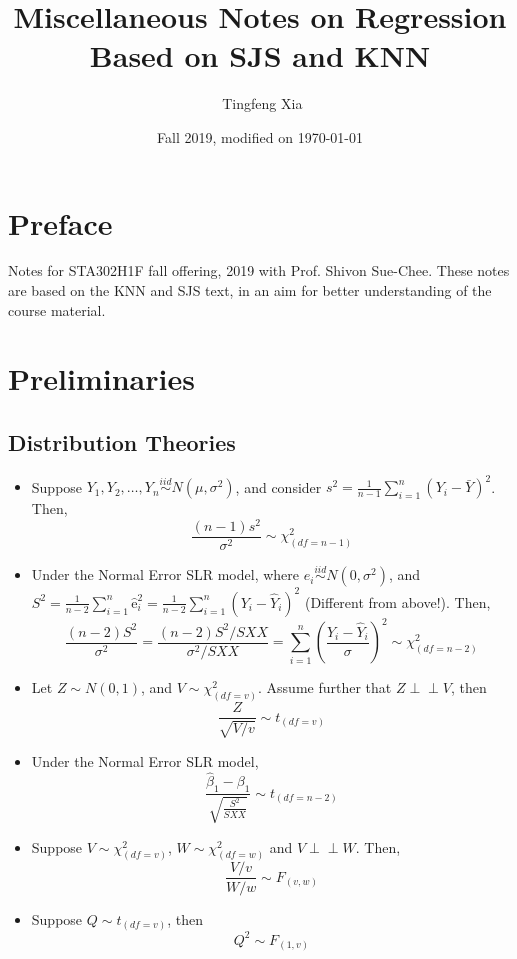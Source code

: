 \documentclass[11pt]{article}
\title{\LARGE{Miscellaneous Notes on Regression}\\ \normalsize{Based on SJS and KNN}}
\author{\ccLogo \,\,Tingfeng Xia}
\date{Fall 2019, modified on \today}
\newcommand{\independent}{\perp \!\!\! \perp}
\begin{document}
\maketitle
\section*{Preface}
Notes for STA302H1F fall offering, 2019 with Prof. Shivon Sue-Chee. These notes are based on the KNN and SJS text, in an aim for better understanding of the course material.
\doclicenseThis
\tableofcontents
\newpage

\section{Preliminaries}
\subsection{Distribution Theories}
\begin{itemize}
    \item Suppose $Y_1, Y_2 ,\dots, Y_n \overset{iid}{\sim} N(\mu, \sigma^2)$, and consider $s^{2}=\frac{1}{n-1} \sum_{i=1}^{n}\left(Y_{i}-\bar{Y}\right)^{2}$. Then,
        \begin{equation*}
            \frac{(n-1) s^{2}}{\sigma^{2}} \sim \chi^{2}_{(d f=n-1)}
        \end{equation*}
    \item Under the Normal Error SLR model, where $e_{i} \overset{iid}{\sim} N\left(0, \sigma^{2}\right)$, and $S^{2}=\frac{1}{n-2} \sum_{i=1}^{n} \hat{\mathrm{e}}_{i}^{2}=\frac{1}{n-2} \sum_{i=1}^{n}\left(Y_{i}-\hat{Y}_{i}\right)^{2}$ (Different from above!). Then,
        \begin{equation*}
            \frac{(n-2) S^{2}}{\sigma^{2}}=\frac{(n-2) S^{2} / S X X}{\sigma^{2} / S X X}=\sum_{i=1}^{n}\left(\frac{Y_{i}-\hat{Y}_{i}}{\sigma}\right)^{2} \sim \chi^{2}_{(d f=n-2)}
        \end{equation*}
    \item Let $Z\sim N(0,1)$, and $V\sim \chi^2_{(df=v)}$. Assume further that $Z\independent V$, then
        \begin{equation*}
            \frac{Z}{\sqrt{V / v}} \sim t_{(df=v)}
        \end{equation*}
    \item Under the Normal Error SLR model,
        \begin{equation*}
            \frac{\hat{\beta}_{1}-\beta_{1}}{\sqrt{\frac{S^{2}}{S X X}}} \sim t_{(df = n-2)}
        \end{equation*}
    \item Suppose $V \sim \chi_{(df=v)}^{2}$, $W \sim \chi_{(df=w)}^2$ and $V\independent W$. Then,
        \begin{equation*}
            \frac{V / v}{W / w} \sim F_{(v, w)}
        \end{equation*}
    \item Suppose $Q\sim t_{(df=v)}$, then
        \begin{equation*}
            Q^2 \sim F_{(1,v)}
        \end{equation*}
\end{itemize}
\end{document}
